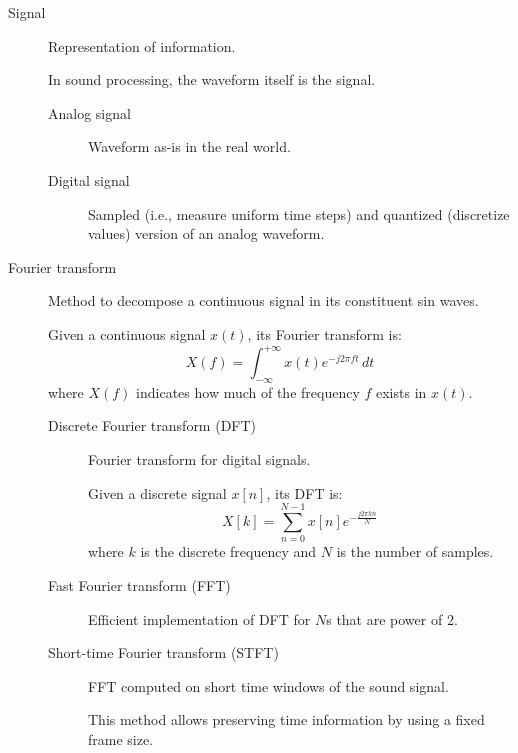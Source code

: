 \begin{description}
    \item[Signal] 
        Representation of information.

        \begin{remark}
            In sound processing, the waveform itself is the signal.
        \end{remark}

        \begin{description}
            \item[Analog signal] 
                Waveform as-is in the real world.

            \item[Digital signal] 
                Sampled (i.e., measure uniform time steps) and quantized (discretize values) version of an analog waveform.
        \end{description}

    \item[Fourier transform] 
        Method to decompose a continuous signal in its constituent sin waves.

        Given a continuous signal $x(t)$, its Fourier transform is:
        \[ X(f) = \int_{-\infty}^{+\infty} x(t) e^{-j2\pi ft} \,dt \]
        where $X(f)$ indicates how much of the frequency $f$ exists in $x(t)$.

        \begin{description}
            \item[Discrete Fourier transform (DFT)] 
                Fourier transform for digital signals.

                Given a discrete signal $x[n]$, its DFT is:
                \[ X[k] = \sum_{n=0}^{N-1} x[n]e^{-\frac{j2\pi kn}{N}} \]
                where $k$ is the discrete frequency and $N$ is the number of samples.

            \item[Fast Fourier transform (FFT)] 
                Efficient implementation of DFT for $N$s that are power of $2$.

            \item[Short-time Fourier transform (STFT)] 
                FFT computed on short time windows of the sound signal.

                \begin{remark}
                    This method allows preserving time information by using a fixed frame size.
                \end{remark}


\end{description}
\end{description}
